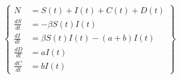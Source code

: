 \documentclass[preview]{standalone}
\begin{document}
\begin{math}
\left \{
\begin{aligned}
    N &= S(t) + I(t) + C(t) + D(t)\\
    \frac{dS}{dt} &= -\beta S(t)I(t)\\
    \frac{dI}{dt} &= \beta S(t)I(t) - (a + b) I(t)\\
    \frac{dD}{dt} &= a I(t)\\
    \frac{dC}{dt} &= b I(t)
\end{aligned}
\right \}
\end{math}

\end{document}
